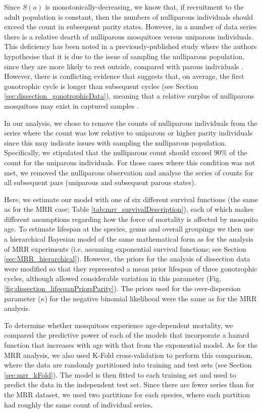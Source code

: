 \documentclass[12pt]{article}
\begin{document}
{Since $S(a)$ is monotonically-decreasing, we know that, if recruitment to the adult population is constant, then the numbers of nulliparous individuals should exceed the count in subsequent parity states. However, in a number of data series there is a relative dearth of nulliparous mosquitoes versus uniparous individuals. This deficiency has been noted in a previously-published study where the authors hypothesise that it is due to the issue of sampling the nulliparous population, since they are more likely to rest outside, compared with parous individuals \citep{gillies1965study}. However, there is conflicting evidence that suggests that, on average, the first gonotrophic cycle is longer than subsequent cycles (see Section \ref{sec:dissection_gonotrophicData}), meaning that a relative surplus of nulliparous mosquitoes may exist in captured samples \citep{clements1981analysis}.

In our analysis, we chose to remove the counts of nulliparous individuals from the series where the count was low relative to uniparous or higher parity individuals since this may indicate issues with sampling the nulliparous population. Specifically, we stipulated that the nulliparous count should exceed 90\% of the count for the uniparous individuals. For those cases where this condition was not met, we removed the nulliparous observation and analyse the series of counts for all subsequent pars (uniparous and subsequent parous states).

Here, we estimate our model with one of six different survival functions (the same as for the MRR case; Table \ref{tab:mrr_survivalDescription}), each of which makes different assumptions regarding how the force of mortality is affected by mosquito age. To estimate lifespan at the species, genus and overall groupings we then use a hierarchical Bayesian model of the same mathematical form as for the analysis of MRR experiments (i.e. assuming exponential survival functions; see Section \ref{sec:MRR_hierarchical}). However, the priors for the analysis of dissection data were modified so that they represented a mean prior lifespan of three gonotrophic cycles, although allowed considerable variation in this parameter (Fig. \ref{fig:dissection_lifespanPriorsParity}). The priors used for the over-dispersion parameter ($\kappa$) for the negative binomial likelihood were the same as for the MRR analysis.

To determine whether mosquitoes experience age-dependent mortality, we compared the predictive power of each of the models that incorporate a hazard function that increases with age with that from the exponential model. As for the MRR analysis, we also used K-Fold cross-validation to perform this comparison, where the data are randomly partitioned into training and test sets (see Section \ref{sec:mrr_kFold}). The model is then fitted to each training set and used to predict the data in the independent test set. Since there are fewer series than for the MRR dataset, we used two partitions for each species, where each partition had roughly the same count of individual series.

}
\end{document}

